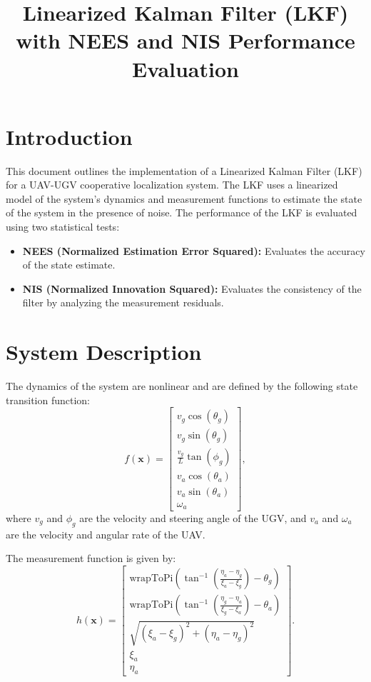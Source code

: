 \documentclass{article}
\begin{document}
\title{Linearized Kalman Filter (LKF) with NEES and NIS Performance Evaluation}
\author{}
\date{}
\maketitle

\section*{Introduction}

This document outlines the implementation of a Linearized Kalman Filter (LKF) for a UAV-UGV cooperative localization system. The LKF uses a linearized model of the system's dynamics and measurement functions to estimate the state of the system in the presence of noise. The performance of the LKF is evaluated using two statistical tests:
\begin{itemize}
    \item \textbf{NEES (Normalized Estimation Error Squared):} Evaluates the accuracy of the state estimate.
    \item \textbf{NIS (Normalized Innovation Squared):} Evaluates the consistency of the filter by analyzing the measurement residuals.
\end{itemize}

\section*{System Description}

The dynamics of the system are nonlinear and are defined by the following state transition function:
\[
f(\mathbf{x}) = \begin{bmatrix}
v_g \cos(\theta_g) \\
v_g \sin(\theta_g) \\
\frac{v_g}{L} \tan(\phi_g) \\
v_a \cos(\theta_a) \\
v_a \sin(\theta_a) \\
\omega_a
\end{bmatrix},
\]
where $v_g$ and $\phi_g$ are the velocity and steering angle of the UGV, and $v_a$ and $\omega_a$ are the velocity and angular rate of the UAV.

The measurement function is given by:
\[
h(\mathbf{x}) = \begin{bmatrix}
\text{wrapToPi}\left(\tan^{-1}\left(\frac{\eta_a - \eta_g}{\xi_a - \xi_g}\right) - \theta_g\right) \\
\text{wrapToPi}\left(\tan^{-1}\left(\frac{\eta_g - \eta_a}{\xi_g - \xi_a}\right) - \theta_a\right) \\
\sqrt{(\xi_a - \xi_g)^2 + (\eta_a - \eta_g)^2} \\
\xi_a \\
\eta_a
\end{bmatrix}.
\]
\end{document}
